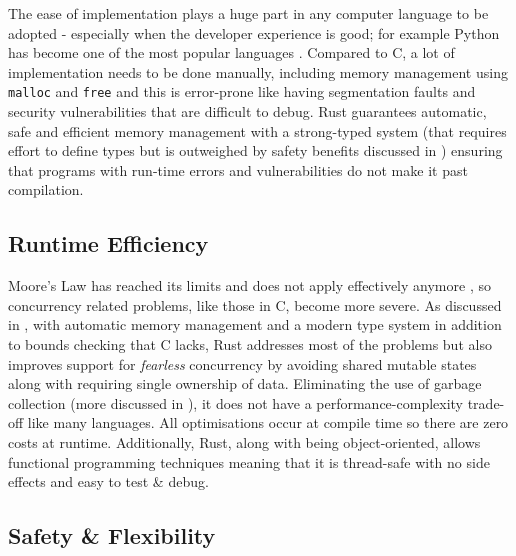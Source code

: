 \documentclass[10pt,a4paper,twocolumn]{article}
\begin{document}
The ease of implementation plays a huge part in any computer language to be adopted - especially when the developer experience is good; for example Python has become one of the most popular languages \cite{srinath2017python}. Compared to C, a lot of implementation needs to be done manually, including memory management using \texttt{malloc} and \texttt{free} and this is error-prone like having segmentation faults and security vulnerabilities that are difficult to debug. Rust guarantees automatic, safe and efficient memory management with a strong-typed system (that requires effort to define types but is outweighed by safety benefits discussed in ) ensuring that programs with run-time errors and vulnerabilities do not make it past compilation.

\subsection*{Runtime Efficiency}\label{subsec:runtime}

Moore's Law \cite{moore1998cramming} has reached its limits and does not apply effectively anymore \cite{10.1007/978-3-642-18206-8_9,4785858,waldrop2016chips,6186749,Tuomi_2002}, so concurrency related problems, like those in C, become more severe. As discussed in , with automatic memory management and a modern type system in addition to bounds checking that C lacks, Rust addresses most of the problems but also improves support for \textit{fearless} concurrency by avoiding shared mutable states along with requiring single ownership of data. Eliminating the use of garbage collection (more discussed in ), it does not have a performance-complexity trade-off like many languages. All optimisations occur at compile time so there are zero costs at runtime. Additionally, Rust, along with being object-oriented, allows functional programming techniques meaning that it is thread-safe with no side effects and easy to test \& debug.

\subsection*{Safety \& Flexibility}\label{subsec:safety}
\end{document}
